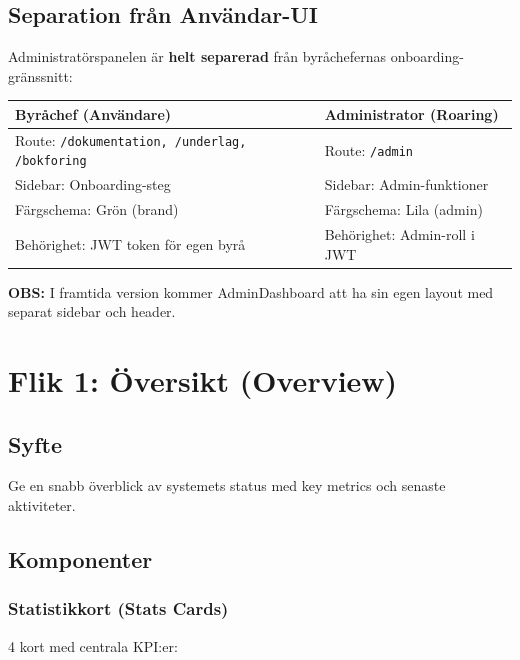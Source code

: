 \documentclass[12pt,a4paper]{article}
\begin{document}
\subsection{Separation från Användar-UI}
Administratörspanelen är \textbf{helt separerad} från byråchefernas onboarding-gränssnitt:

\begin{table}[h]
\centering
\begin{tabular}{|l|l|}
\hline
\textbf{Byråchef (Användare)} & \textbf{Administrator (Roaring)} \\
\hline
Route: \texttt{/dokumentation, /underlag, /bokforing} & Route: \texttt{/admin} \\
Sidebar: Onboarding-steg & Sidebar: Admin-funktioner \\
Färgschema: Grön (brand) & Färgschema: Lila (admin) \\
Behörighet: JWT token för egen byrå & Behörighet: Admin-roll i JWT \\
\hline
\end{tabular}
\end{table}

\vspace{1cm}
\textbf{OBS:} I framtida version kommer AdminDashboard att ha sin egen layout med separat sidebar och header.

\section{Flik 1: Översikt (Overview)}

\subsection{Syfte}
Ge en snabb överblick av systemets status med key metrics och senaste aktiviteter.

\subsection{Komponenter}

\subsubsection{Statistikkort (Stats Cards)}
4 kort med centrala KPI:er:
\end{document}
